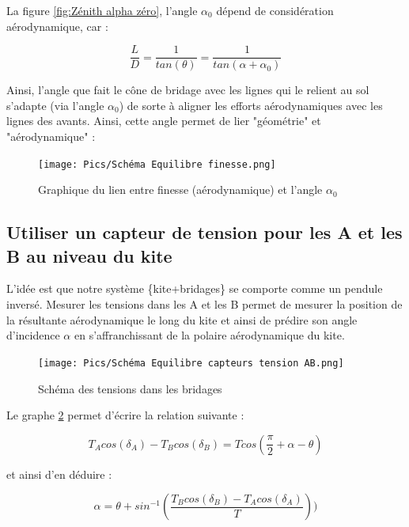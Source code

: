 \documentclass[conference]{IEEEtran}
\begin{document}
La figure \ref{fig:Zénith alpha zéro}, l'angle $\alpha_0$ dépend de considération aérodynamique, car : 
\begin{center}
    \begin{equation}
        \frac{L}{D} = \frac{1}{tan(\theta)} = \frac{1}{tan(\alpha + \alpha_0)}
    \end{equation}
\end{center}
Ainsi, l'angle que fait le cône de bridage avec les lignes qui le relient au sol s'adapte (via l'angle $\alpha_0$) de sorte à aligner les efforts aérodynamiques avec les lignes des avants. Ainsi, cette angle permet de lier "géométrie" et "aérodynamique" :  

\begin{figure}[H]
    \centering
    \texttt{[image: Pics/Schéma Equilibre finesse.png]}  
    \caption{Graphique du lien entre finesse (aérodynamique) et l'angle $\alpha_0$}
    \label{fig:Zénith finesse}
\end{figure}


\subsection{Utiliser un capteur de tension pour les A et les B au niveau du kite}

L'idée est que notre système \{kite+bridages\} se comporte comme un pendule inversé. Mesurer les tensions dans les A et les B permet de mesurer la position de la résultante aérodynamique le long du kite et ainsi de prédire son angle d'incidence $\alpha$ en s'affranchissant de la polaire aérodynamique du kite. 

\begin{figure}[H]
    \centering
    \texttt{[image: Pics/Schéma Equilibre capteurs tension AB.png]}  
    \caption{Schéma des tensions dans les bridages}
    \label{fig:Zénith tensions AB}
\end{figure}

Le graphe \ref{fig:Zénith tensions AB} permet d'écrire la relation suivante : 
\begin{center}
    \begin{equation}
        T_A cos(\delta_A) - T_B cos(\delta_B) = T cos(\frac{\pi}{2} +\alpha - \theta)
    \end{equation}
\end{center}

et ainsi d'en déduire :

\begin{center}
    \begin{equation}
        \alpha = \theta + sin^{-1}(\frac{T_B cos(\delta_B) - T_A cos(\delta_A)}{T}))
    \end{equation}
\end{center}
\end{document}
